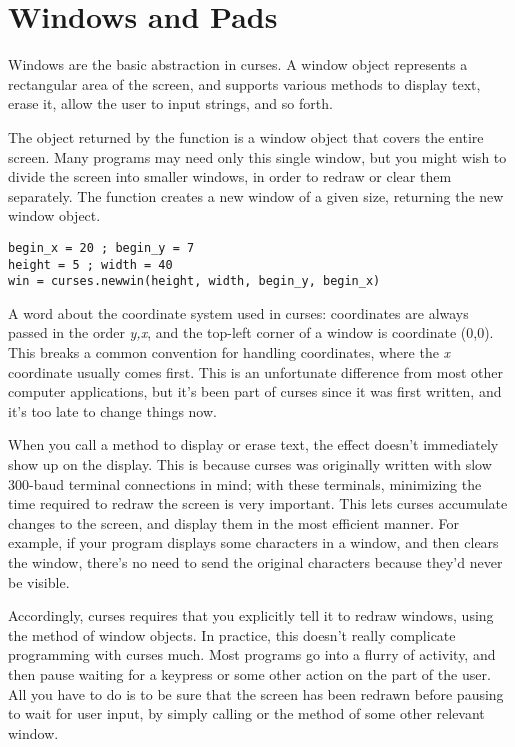 \documentclass{howto}
\begin{document}
\section{Windows and Pads}

Windows are the basic abstraction in curses.  A window object
represents a rectangular area of the screen, and supports various
 methods to display text, erase it, allow the user to input strings,
and so forth.

The  object returned by the  function
is a window object that covers the entire screen.  Many programs may
need only this single window, but you might wish to divide the screen
into smaller windows, in order to redraw or clear them separately.
The  function creates a new window of a given size,
returning the new window object.

\begin{verbatim}
begin_x = 20 ; begin_y = 7
height = 5 ; width = 40
win = curses.newwin(height, width, begin_y, begin_x)
\end{verbatim}

A word about the coordinate system used in curses: coordinates are
always passed in the order \emph{y,x}, and the top-left corner of a
window is coordinate (0,0).  This breaks a common convention for
handling coordinates, where the \emph{x} coordinate usually comes
first.  This is an unfortunate difference from most other computer
applications, but it's been part of curses since it was first written,
and it's too late to change things now.

When you call a method to display or erase text, the effect doesn't
immediately show up on the display.  This is because curses was
originally written with slow 300-baud terminal connections in mind;
with these terminals, minimizing the time required to redraw the
screen is very important.  This lets curses accumulate changes to the
screen, and display them in the most efficient manner.  For example,
if your program displays some characters in a window, and then clears
the window, there's no need to send the original characters because
they'd never be visible.  

Accordingly, curses requires that you explicitly tell it to redraw
windows, using the  method of window objects.  In
practice, this doesn't really complicate programming with curses much.
Most programs go into a flurry of activity, and then pause waiting for
a keypress or some other action on the part of the user.  All you have
to do is to be sure that the screen has been redrawn before pausing to
wait for user input, by simply calling  or the
 method of some other relevant window.
\end{document}
